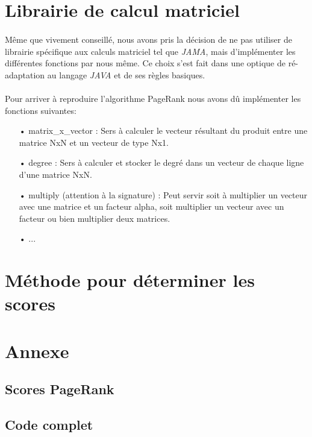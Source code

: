 \documentclass[10pt,a4paper]{article}
\begin{document}
\section{Librairie de calcul matriciel}

\paragraph{}Même que vivement conseillé, nous avons pris la décision de ne pas utiliser de librairie spécifique aux calculs matriciel tel que \textit{JAMA}, mais d'implémenter les différentes fonctions par nous même. Ce choix s'est fait dans une optique de ré-adaptation au langage \textit{JAVA} et de ses règles basiques. %
\paragraph{}Pour arriver à reproduire l'algorithme PageRank nous avons dû implémenter les fonctions suivantes:

\hspace{1.5cm}

\begin{itemize}
    \item[•] matrix\_x\_vector : Sers à calculer le vecteur résultant du produit entre une matrice NxN et un vecteur de type Nx1.
    \item[•] degree : Sers à calculer et stocker le degré dans un vecteur de chaque ligne d'une matrice NxN.
    \item[•] multiply (attention à la signature) : Peut servir soit à multiplier un vecteur avec une matrice et un facteur alpha, soit multiplier un vecteur avec un facteur ou bien multiplier deux matrices.
    \item[•] ...
\end{itemize}

\section{Méthode pour déterminer les scores}


\section{Annexe}

\subsection{Scores PageRank}


\subsection{Code complet}
\end{document}
